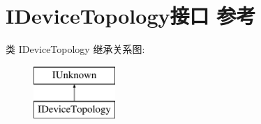 \hypertarget{interface_i_device_topology}{}\section{I\+Device\+Topology接口 参考}
\label{interface_i_device_topology}
类 I\+Device\+Topology 继承关系图\+:\begin{figure}[H]
\begin{center}
\leavevmode
\includegraphics[height=2.000000cm]{interface_i_device_topology}
\end{center}
\end{figure}
